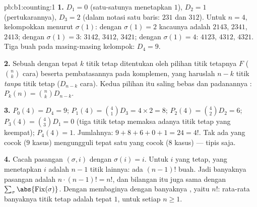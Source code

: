 \begin{solution}{pb:b1:counting:1}
\textbf{1.} $D_1 = 0$ (satu-satunya  menetapkan $1$), $D_2 = 1$
(pertukarannya), $D_3 = 2$ (dalam notasi satu baris: $231$ dan $312$). Untuk
$n = 4$, kelompokkan menurut $\sigma(1)$: dengan $\sigma(1) = 2$  kacaunya
adalah $2143$, $2341$, $2413$; dengan $\sigma(1) = 3$: $3142$, $3412$,
$3421$; dengan $\sigma(1) = 4$: $4123$, $4312$, $4321$. Tiga buah pada masing-masing
kelompok: $D_4 = 9$.

\textbf{2.} Sebuah  dengan tepat $k$ titik tetap
ditentukan oleh pilihan  titik tetapnya $F$ ($\binom nk$
cara) beserta pembatasannya pada komplemen, yang haruslah
 $n - k$ titik \emph{tanpa} titik tetap
($D_{n-k}$ cara). Kedua pilihan itu saling bebas dan
padanannya : $P_k(n) = \binom nk D_{n-k}$.

\textbf{3.} $P_0(4) = D_4 = 9$; $P_1(4) = \binom41 D_3 = 4 \times 2
= 8$; $P_2(4) = \binom42 D_2 = 6$; $P_3(4) = \binom43 D_1 = 0$
(tiga titik tetap memaksa adanya titik tetap yang keempat); $P_4(4) = 1$. Jumlahnya: $9 + 8 + 6
+ 0 + 1 = 24 = 4!$. Tak ada yang cocok ($9$ kasus) mengungguli tepat satu yang cocok
($8$ kasus) --- tipis saja.

\textbf{4.} Cacah pasangan $(\sigma, i)$ dengan $\sigma(i) = i$. Untuk
$i$ yang tetap,  yang menetapkan $i$ adalah 
$n - 1$ titik lainnya: ada $(n-1)!$ buah. Jadi banyaknya pasangan
adalah $n \cdot (n-1)! = n!$, dan bilangan itu juga sama dengan
$\sum_\sigma \abs{\mathrm{Fix}(\sigma)}$. Dengan membaginya dengan banyaknya
, yaitu $n!$: rata-rata banyaknya titik tetap adalah
tepat $1$, untuk setiap $n \geq 1$.


\end{solution}
